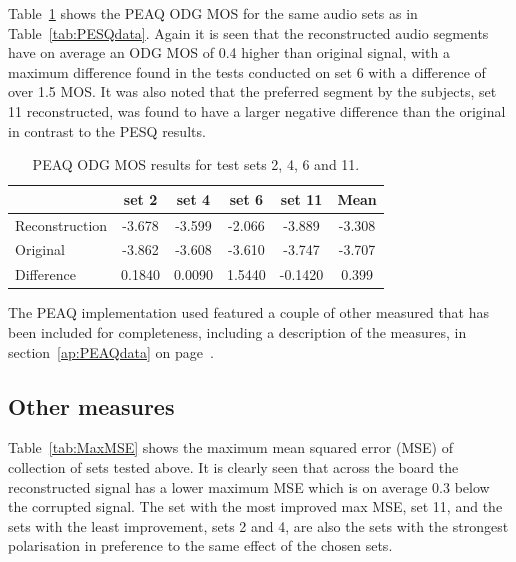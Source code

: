 


Table~\ref{tab:PEAQdataODG} shows the PEAQ ODG MOS for the same audio sets as in Table~\ref{tab:PESQdata}. Again it is seen that the reconstructed audio segments have on average an ODG MOS of 0.4 higher than original signal, with a maximum difference found in the tests conducted on set 6 with a difference of over 1.5 MOS. It was also noted that the preferred segment by the subjects, set 11 reconstructed, was found to have a larger negative difference than the original in contrast to the PESQ results.

\begin{table}\begin{center}
\caption{PEAQ ODG MOS results for test sets 2, 4, 6 and 11.}
\label{tab:PEAQdataODG}
\begin{tabular}{|l|c|c|c|c|c|}\hline
                    & set 2     & set 4     & set 6     & set 11    & Mean      \\ \hline
  Reconstruction    & -3.678    & -3.599    & -2.066    & -3.889    & -3.308    \\
  Original          & -3.862    & -3.608    & -3.610    & -3.747    & -3.707    \\ \hline
  Difference        & 0.1840    & 0.0090    & 1.5440    & -0.1420   & 0.399     \\
  \hline
\end{tabular}\end{center}\end{table}

The PEAQ implementation used\cite{Loizou2007} featured a couple of other measured that has been included for completeness, including a description of the measures, in section~\ref{ap:PEAQdata} on page~\pageref{ap:PEAQdata}.

\subsection{Other measures}
Table~\ref{tab:MaxMSE} shows the maximum mean squared error (MSE) of collection of sets tested above. It is clearly seen that across the board the reconstructed signal has a lower maximum MSE which is on average 0.3 below the corrupted signal. The set with the most improved max MSE, set 11, and the sets with the least improvement, sets 2 and 4, are also the sets with the strongest polarisation in preference to the same effect of the chosen sets.

